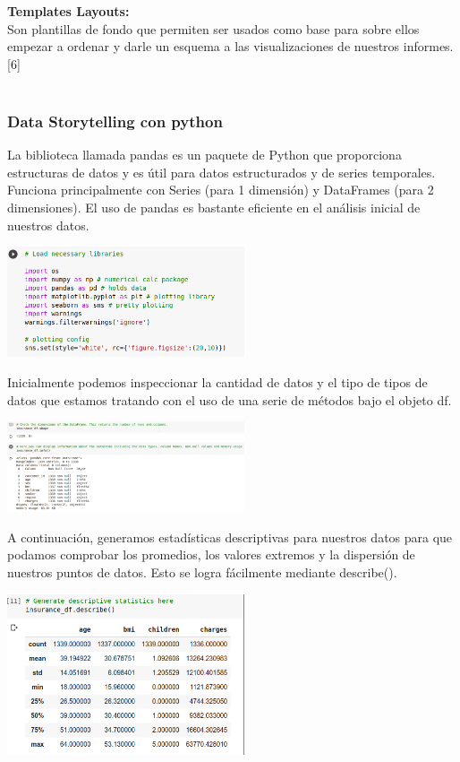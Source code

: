 \documentclass[twoside,twocolumn]{article}
\begin{document}
\textbf{Templates Layouts:}
 \\Son plantillas de fondo que permiten ser usados como
  base para sobre ellos empezar a ordenar y darle un 
  esquema a las visualizaciones de nuestros informes.[6]\\\\


  \subsubsection{Data Storytelling con python}
  
  La biblioteca llamada pandas es un paquete de Python que proporciona estructuras de datos y es útil para datos estructurados y de series temporales. Funciona principalmente con Series (para 1 dimensión) y DataFrames (para 2 dimensiones). El uso de pandas es bastante eficiente en el análisis inicial de nuestros datos.
  \begin{center}
	\includegraphics[width=7cm]{./imagenes/p1.png} 
\end{center}


Inicialmente podemos inspeccionar la cantidad de datos y el tipo de tipos de datos que estamos tratando con el uso de una serie de métodos bajo el objeto df.
\begin{center}
	\includegraphics[width=7cm]{./imagenes/p2.png} 
\end{center}

A continuación, generamos estadísticas descriptivas para nuestros datos para que podamos comprobar los promedios, los valores extremos y la dispersión de nuestros puntos de datos. Esto se logra fácilmente mediante describe().
\begin{center}
	\includegraphics[width=7cm]{./imagenes/p3.png} 
\end{center}
\end{document}
